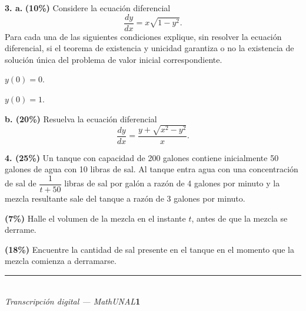\documentclass[11pt]{article}
\begin{document}
\newpage

\noindent\textbf{3. a.} \textbf{(10\%)} Considere la ecuación diferencial
\[
\frac{dy}{dx}=x\sqrt{1-y^2}.
\]
Para cada una de las siguientes condiciones explique, sin resolver la ecuación diferencial, si el teorema de existencia y unicidad garantiza o no la existencia de solución única del problema de valor inicial correspondiente.
\begin{romanos}
\item $y(0)=0$.
\item $y(0)=1$.
\end{romanos}

\vspace{3cm}

\noindent\textbf{b. (20\%)} Resuelva la ecuación diferencial
\[
\frac{dy}{dx}=\frac{y+\sqrt{x^2-y^2}}{x}.
\]

\vspace{6cm}

\newpage

\noindent\textbf{4. (25\%)} Un tanque con capacidad de 200 galones contiene inicialmente 50 galones de agua con 10 libras de sal. Al tanque entra agua con una concentración de sal de $\dfrac{1}{t+50}$ libras de sal por galón a razón de 4 galones por minuto y la mezcla resultante sale del tanque a razón de 3 galones por minuto.

\begin{opciones}
\item \textbf{(7\%)} Halle el volumen de la mezcla en el instante $t$, antes de que la mezcla se derrame.
\item \textbf{(18\%)} Encuentre la cantidad de sal presente en el tanque en el momento que la mezcla comienza a derramarse.
\end{opciones}

\vspace{6cm}

\vfill
\rule{\linewidth}{0.4pt}\\[1pt]
{\scriptsize\textit{Transcripción digital --- MathUNAL}\hfill\textcolor{unalblue}{\textbf{1}}}
\end{document}
